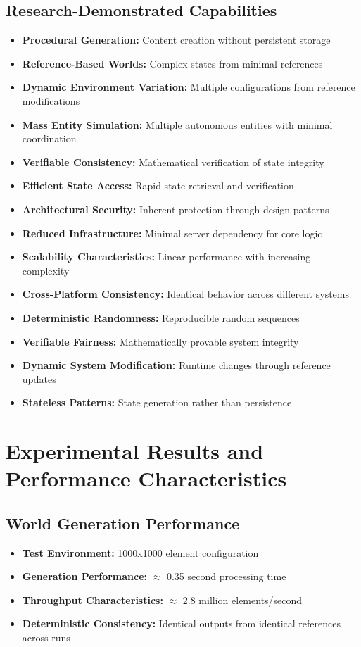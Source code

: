 \documentclass[14pt, a4paper]{extarticle}
\begin{document}
\subsection{Research-Demonstrated Capabilities}
\begin{itemize}
    \item \textbf{Procedural Generation:} Content creation without persistent storage
    \item \textbf{Reference-Based Worlds:} Complex states from minimal references
    \item \textbf{Dynamic Environment Variation:} Multiple configurations from reference modifications
    \item \textbf{Mass Entity Simulation:} Multiple autonomous entities with minimal coordination
    \item \textbf{Verifiable Consistency:} Mathematical verification of state integrity
    \item \textbf{Efficient State Access:} Rapid state retrieval and verification
    \item \textbf{Architectural Security:} Inherent protection through design patterns
    \item \textbf{Reduced Infrastructure:} Minimal server dependency for core logic
    \item \textbf{Scalability Characteristics:} Linear performance with increasing complexity
    \item \textbf{Cross-Platform Consistency:} Identical behavior across different systems
    \item \textbf{Deterministic Randomness:} Reproducible random sequences
    \item \textbf{Verifiable Fairness:} Mathematically provable system integrity
    \item \textbf{Dynamic System Modification:} Runtime changes through reference updates
    \item \textbf{Stateless Patterns:} State generation rather than persistence
\end{itemize}

\section{Experimental Results and Performance Characteristics}

\subsection{World Generation Performance}
\begin{itemize}
    \item \textbf{Test Environment:} 1000x1000 element configuration
    \item \textbf{Generation Performance:} $\approx$ 0.35 second processing time
    \item \textbf{Throughput Characteristics:} $\approx$ 2.8 million elements/second
    \item \textbf{Deterministic Consistency:} Identical outputs from identical references across runs
\end{itemize}
\end{document}
